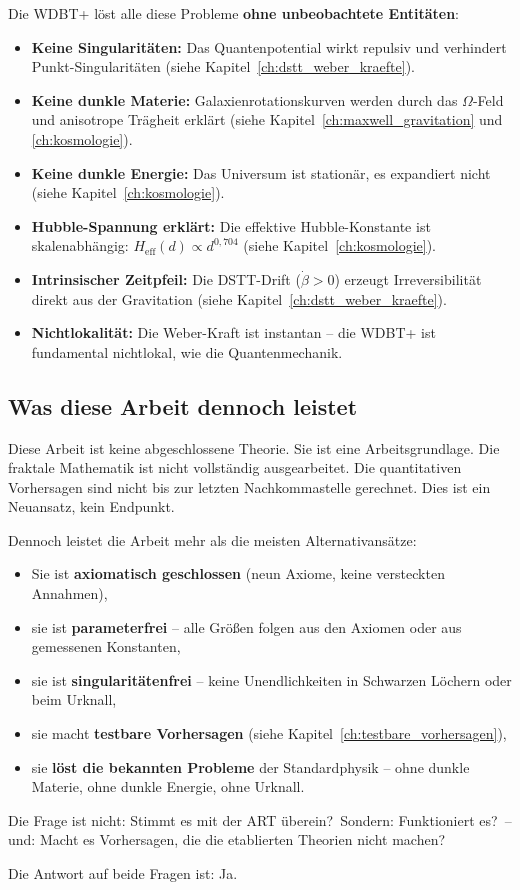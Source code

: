 Die WDBT+ löst alle diese Probleme \textbf{ohne unbeobachtete Entitäten}:

\begin{itemize}
    \item \textbf{Keine Singularitäten:} Das Quantenpotential wirkt repulsiv und verhindert Punkt-Singularitäten (siehe Kapitel~\ref{ch:dstt_weber_kraefte}).
    \item \textbf{Keine dunkle Materie:} Galaxienrotationskurven werden durch das \(\Omega\)-Feld und anisotrope Trägheit erklärt (siehe Kapitel~\ref{ch:maxwell_gravitation} und \ref{ch:kosmologie}).
    \item \textbf{Keine dunkle Energie:} Das Universum ist stationär, es expandiert nicht (siehe Kapitel~\ref{ch:kosmologie}).
    \item \textbf{Hubble-Spannung erklärt:} Die effektive Hubble-Konstante ist skalenabhängig: \(H_{\text{eff}}(d) \propto d^{0,704}\) (siehe Kapitel~\ref{ch:kosmologie}).
    \item \textbf{Intrinsischer Zeitpfeil:} Die DSTT-Drift (\(\dot{\beta}>0\)) erzeugt Irreversibilität direkt aus der Gravitation (siehe Kapitel~\ref{ch:dstt_weber_kraefte}).
    \item \textbf{Nichtlokalität:} Die Weber-Kraft ist instantan – die WDBT+ ist fundamental nichtlokal, wie die Quantenmechanik.
\end{itemize}

\subsection*{Was diese Arbeit dennoch leistet}

Diese Arbeit ist keine abgeschlossene Theorie. Sie ist eine Arbeitsgrundlage. Die fraktale Mathematik ist nicht vollständig ausgearbeitet. Die quantitativen Vorhersagen sind nicht bis zur letzten Nachkommastelle gerechnet. Dies ist ein Neuansatz, kein Endpunkt.

Dennoch leistet die Arbeit mehr als die meisten Alternativansätze:

\begin{itemize}
    \item Sie ist \textbf{axiomatisch geschlossen} (neun Axiome, keine versteckten Annahmen),
    \item sie ist \textbf{parameterfrei} – alle Größen folgen aus den Axiomen oder aus gemessenen Konstanten,
    \item sie ist \textbf{singularitätenfrei} – keine Unendlichkeiten in Schwarzen Löchern oder beim Urknall,
    \item sie macht \textbf{testbare Vorhersagen} (siehe Kapitel~\ref{ch:testbare_vorhersagen}),
    \item sie \textbf{löst die bekannten Probleme} der Standardphysik – ohne dunkle Materie, ohne dunkle Energie, ohne Urknall.
\end{itemize}

Die Frage ist nicht: \glqq Stimmt es mit der ART überein?\grqq\ Sondern: \glqq Funktioniert es?\grqq\ – und: \glqq Macht es Vorhersagen, die die etablierten Theorien nicht machen?\grqq

Die Antwort auf beide Fragen ist: Ja.